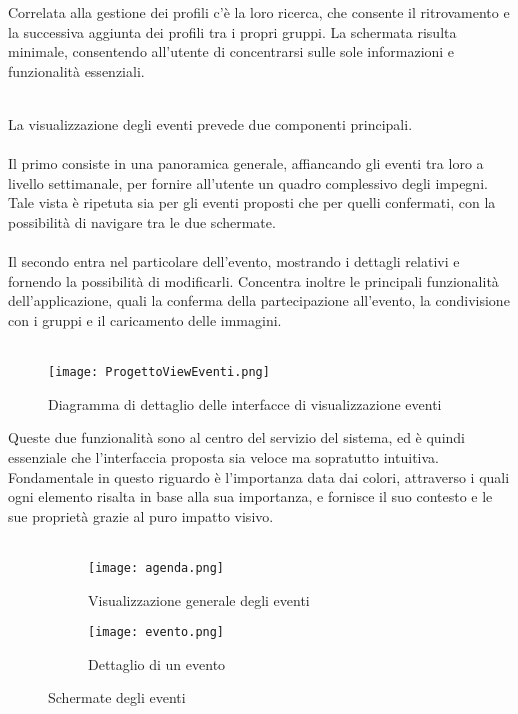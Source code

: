 Correlata alla gestione dei profili c'è la loro ricerca, 
che consente il ritrovamento e la successiva aggiunta dei profili tra i propri gruppi.
La schermata risulta minimale, 
consentendo all'utente di concentrarsi sulle sole informazioni e funzionalità essenziali.\\
\\



\clearpage

La visualizzazione degli eventi prevede due componenti principali.\\
\\
Il primo consiste in una panoramica generale, affiancando gli eventi tra loro a livello settimanale,
per fornire all'utente un quadro complessivo degli impegni. 
Tale vista è ripetuta sia per gli eventi proposti che per quelli confermati, 
con la possibilità di navigare tra le due schermate.\\
\\
Il secondo entra nel particolare dell'evento, 
mostrando i dettagli relativi e fornendo la possibilità di modificarli. 
Concentra inoltre le principali funzionalità dell'applicazione, 
quali la conferma della partecipazione all'evento, 
la condivisione con i gruppi e il caricamento delle immagini.\\
\\

\begin{figure}[h!]
    \begin{center}
        \texttt{[image: ProgettoViewEventi.png]}
        \caption{Diagramma di dettaglio delle interfacce di visualizzazione eventi}
    \end{center}
\end{figure}
\clearpage

Queste due funzionalità sono al centro del servizio del sistema, 
ed è quindi essenziale che l'interfaccia proposta sia veloce ma sopratutto intuitiva.
Fondamentale in questo riguardo è l'importanza data dai colori, attraverso i quali
ogni elemento risalta in base alla sua importanza, e fornisce il suo contesto e le sue proprietà 
grazie al puro impatto visivo.\\
\\



\begin{figure}[htbp]
    \centering
    \begin{subfigure}{0.49\textwidth}
        \centering
        \texttt{[image: agenda.png]}
        \caption{Visualizzazione generale degli eventi}
    \end{subfigure}
    \hfill
    \begin{subfigure}{0.49\textwidth}
        \centering
        \texttt{[image: evento.png]}
        \caption{Dettaglio di un evento}
    \end{subfigure}
    \caption{Schermate degli eventi}
\end{figure}

